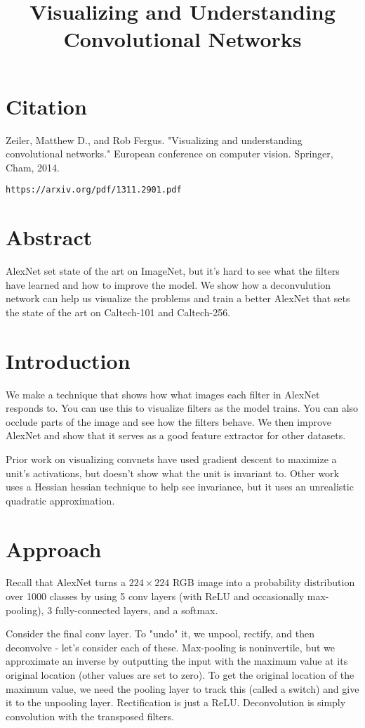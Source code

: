 \documentclass[a4paper]{article}
\title{Visualizing and Understanding Convolutional Networks}
\date{}
\begin{document}
\maketitle

\section{Citation}
Zeiler, Matthew D., and Rob Fergus. "Visualizing and understanding convolutional networks." European conference on computer vision. Springer, Cham, 2014.

\begin{verbatim}
https://arxiv.org/pdf/1311.2901.pdf
\end{verbatim}

\section{Abstract}
AlexNet set state of the art on ImageNet, but it's hard to see what the filters
have learned and how to improve the model. We show how a deconvulution network
can help us visualize the problems and train a better AlexNet that sets
the state of the art on Caltech-101 and Caltech-256.

\section{Introduction}
We make a technique that shows how what images each filter in AlexNet responds
to. You can use this to visualize filters as the model trains. You can also
occlude parts of the image and see how the filters behave. We then improve
AlexNet and show that it serves as a good feature extractor for other datasets.

Prior work on visualizing convnets have used gradient descent to maximize a
unit's activations, but doesn't show what the unit is invariant to. Other work
uses a Hessian hessian technique to help see invariance, but it uses an
unrealistic quadratic approximation.

\section{Approach}
Recall that AlexNet turns a $224 \times 224$ RGB image into a probability
distribution over 1000 classes by using 5 conv layers (with ReLU and
occasionally max-pooling), 3 fully-connected layers, and a softmax.

Consider the final conv layer. To "undo" it, we unpool, rectify, and then
deconvolve - let's consider each of these. Max-pooling is noninvertile, but
we approximate an inverse by outputting the input with the maximum value
at its original location (other values are set to zero). To get the original
location of the maximum value, we need the pooling layer to track this (called
a switch) and give it to the unpooling layer. Rectification is just a ReLU.
Deconvolution is simply convolution with the transposed filters.
\end{document}
